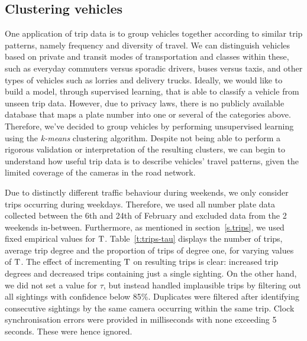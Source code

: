 \subsection{Clustering vehicles}\label{s.classification}

One application of trip data is to group vehicles together according to similar trip patterns, namely frequency and diversity of travel. We can distinguish vehicles based on private and transit modes of transportation and classes within these, such as everyday commuters versus sporadic drivers, buses versus taxis, and other types of vehicles such as lorries and delivery trucks. Ideally, we would like to build a model, through supervised learning, that is able to classify a vehicle from unseen trip data. However, due to privacy laws, there is no publicly available database that maps a plate number into one or several of the categories above. Therefore, we've decided to group vehicles by performing unsupervised learning using the \emph{k-means} clustering algorithm. Despite not being able to perform a rigorous validation or interpretation of the resulting clusters, we can begin to understand how useful trip data is to describe vehicles' travel patterns, given the limited coverage of the cameras in the road network.

Due to distinctly different traffic behaviour during weekends, we only consider trips occurring during weekdays. Therefore, we used all number plate data collected between the 6th and 24th of February and excluded data from the 2 weekends in-between. Furthermore, as mentioned in section~\ref{s.trips}, we used fixed empirical values for $\mathrm{T}$. Table~\ref{t:trips-tau} displays the number of trips, average trip degree and the proportion of trips of degree one, for varying values of $\mathrm{T}$. The effect of incrementing $\mathrm{T}$ on resulting trips is clear: increased trip degrees and decreased trips containing just a single sighting. On the other hand, we did not set a value for $\tau$, but instead handled implausible trips by filtering out all sightings with confidence below 85\%. Duplicates were filtered after identifying consecutive sightings by the same camera occurring within the same trip. Clock synchronisation errors were provided in milliseconds with none exceeding 5 seconds. These were hence ignored.

